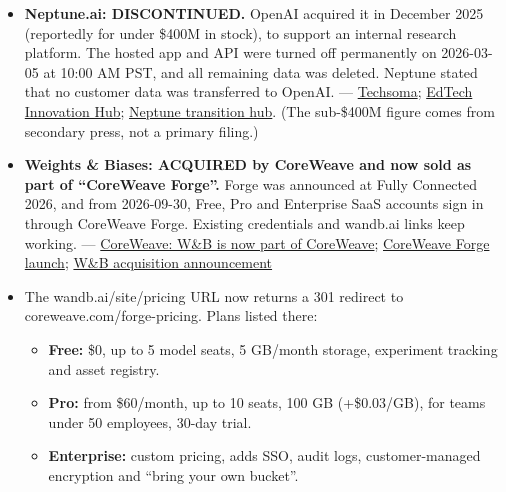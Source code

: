 \documentclass{article}
\begin{document}
\begin{itemize}

\item \textbf{Neptune.ai: DISCONTINUED.} OpenAI acquired it in December 2025 (reportedly for under \$400M in stock), to support an internal research platform. The hosted app and API were turned off permanently on 2026-03-05 at 10:00 AM PST, and all remaining data was deleted. Neptune stated that no customer data was transferred to OpenAI. --- \href{https://techsoma.ca/openai-neptune-acquisition-shutdown/}{Techsoma}; \href{https://www.edtechinnovationhub.com/news/openai-moves-to-acquire-neptuneai-as-experiment-tracking-platform-prepares-three-month-shutdown}{EdTech Innovation Hub}; \href{https://docs.neptune.ai/transition_hub}{Neptune transition hub}. (The sub-\$400M figure comes from secondary press, not a primary filing.)

\item \textbf{Weights \& Biases: ACQUIRED by CoreWeave and now sold as part of ``CoreWeave Forge''.} Forge was announced at Fully Connected 2026, and from 2026-09-30, Free, Pro and Enterprise SaaS accounts sign in through CoreWeave Forge. Existing credentials and wandb.ai links keep working. --- \href{https://www.coreweave.com/companies/weights-and-biases}{CoreWeave: W\&B is now part of CoreWeave}; \href{https://www.coreweave.com/news/coreweave-forge-launches-turning-the-ai-loop-production-run-into-a-better-model-and-agent}{CoreWeave Forge launch}; \href{https://wandb.ai/wandb_fc/cw-announcement/reports/Weights-Biases-completes-acquisition-by-CoreWeave--VmlldzoxMjU4MzE5OQ}{W\&B acquisition announcement}

\item The wandb.ai/\allowbreak{}site/\allowbreak{}pricing URL now returns a 301 redirect to coreweave.com/\allowbreak{}forge-pricing. Plans listed there:

\begin{itemize}

\item \textbf{Free:} \$0, up to 5 model seats, 5 GB/\allowbreak{}month storage, experiment tracking and asset registry.

\item \textbf{Pro:} from \$60/\allowbreak{}month, up to 10 seats, 100 GB (+\$0.03/\allowbreak{}GB), for teams under 50 employees, 30-day trial.

\item \textbf{Enterprise:} custom pricing, adds SSO, audit logs, customer-managed encryption and ``bring your own bucket''.


\end{itemize}
\end{itemize}
\end{document}
